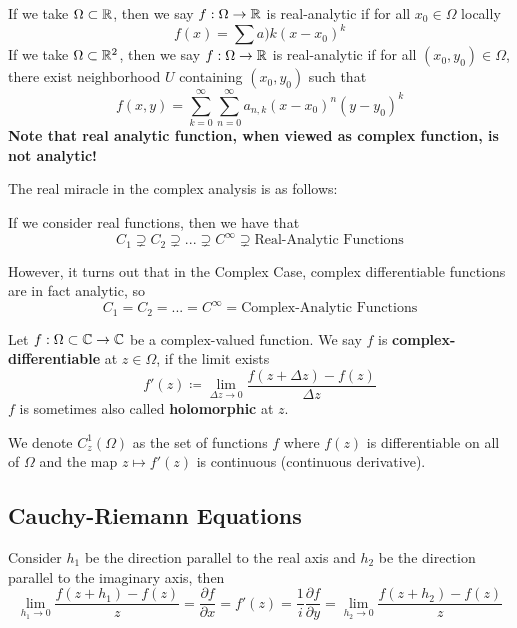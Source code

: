 \documentclass{article}
\begin{document}
\begin{remark}
    If we take $\Omega \subset \mathbb{R}$, then we say $f: \Omega \to \mathbb{R}$ is real-analytic if for all $x_0 \in \Omega$ locally
    \[f(x) = \sum a)k (x - x_0)^k\]
    If we take $\Omega \subset \mathbb{R}^2$, then we say $f: \Omega \to \mathbb{R}$ is real-analytic if for all $(x_0, y_0) \in \Omega$, there exist neighborhood $U$ containing $(x_0, y_0)$ such that
    \[f(x, y) = \sum_{k = 0}^\infty \sum_{n = 0}^\infty a_{n, k} (x - x_0)^n (y - y_0)^k\]
    \textbf{Note that real analytic function, when viewed as complex function, is not analytic!}
\end{remark}

The real miracle in the complex analysis is as follows:

If we consider real functions, then we have that
\[C_1 \supsetneq C_2 \supsetneq ... \supsetneq C^\infty \supsetneq \text{Real-Analytic Functions}\]

However, it turns out that in the Complex Case, complex differentiable functions are in fact analytic, so
\[C_1 = C_2 = ... = C^\infty = \text{Complex-Analytic Functions}\]


\begin{definition}
Let $f: \Omega \subset \mathbb{C} \to \mathbb{C}$ be a complex-valued function. We say $f$ is \textbf{complex-differentiable} at $z \in \Omega$, if the limit exists
\[f'(z) \coloneqq \lim_{\Delta z \to 0} \frac{f(z + \Delta z) - f(z)}{\Delta z}\]
$f$ is sometimes also called \textbf{holomorphic} at $z$.
\end{definition}

\begin{definition}
We denote $C^1_z(\Omega)$ as the set of functions $f$ where $f(z)$ is differentiable on all of $\Omega$ and the map $z \mapsto f'(z)$ is continuous (continuous derivative).
\end{definition}

\subsection{Cauchy-Riemann Equations}

Consider $h_1$ be the direction parallel to the real axis and $h_2$ be the direction parallel to the imaginary axis, then
\[\lim_{h_1 \to 0} \frac{f(z + h_1) - f(z)}{z} = \frac{\partial f}{\partial x} = f'(z) = \frac{1}{i} \frac{\partial f}{\partial y} = \lim_{h_2 \to 0} \frac{f(z + h_2) - f(z)}{z}\]
\end{document}
